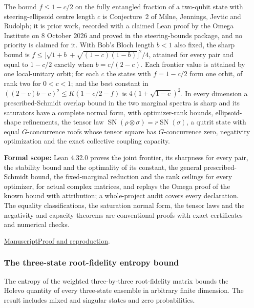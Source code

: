 \documentclass[11pt,a4paper]{article}
\begin{document}
The bound $f\leq1-c/2$ on the fully entangled fraction of a two-qubit state with steering-ellipsoid centre length $c$ is Conjecture~2 of Milne, Jennings, Jevtic and Rudolph; it is prior work, recorded with a claimed Lean proof by the Omega Institute on 8 October 2026 and proved in the steering-bounds package, and no priority is claimed for it. With Bob's Bloch length $b<1$ also fixed, the sharp bound is $f\leq\bigl[\sqrt{1+b}+\sqrt{(1-c)(1-b)}\bigr]^2/4$, attained for every pair and equal to $1-c/2$ exactly when $b=c/(2-c)$. Each frontier value is attained by one local-unitary orbit; for each $c$ the states with $f=1-c/2$ form one orbit, of rank two for $0<c<1$; and the best constant in $((2-c)b-c)^2\leq K(1-c/2-f)$ is $4(1+\sqrt{1-c})^2$. In every dimension a prescribed-Schmidt overlap bound in the two marginal spectra is sharp and its saturators have a complete normal form, with optimizer-rank bounds, ellipsoid-shape refinements, the tensor law $\operatorname{SN}(\rho\otimes\sigma)=r\operatorname{SN}(\sigma)$, a qutrit state with equal $G$-concurrence roofs whose tensor square has $G$-concurrence zero, negativity optimization and the exact collective coupling capacity.

\noindent\textbf{Formal scope:} Lean 4.32.0 proves the joint frontier, its sharpness for every pair, the stability bound and the optimality of its constant, the general prescribed-Schmidt bound, the fixed-marginal reduction and the rank ceilings for every optimizer, for actual complex matrices, and replays the Omega proof of the known bound with attribution; a whole-project audit covers every declaration. The equality classifications, the saturation normal form, the tensor laws and the negativity and capacity theorems are conventional proofs with exact certificates and numerical checks.

\href{https://github.com/dvgyl/math-and-theory/blob/main/papers/physics/entangled-fraction-frontier/manuscript.pdf}{Manuscript}\quad\href{https://github.com/dvgyl/math-and-theory/blob/main/papers/physics/entangled-fraction-frontier/README.md}{Proof and reproduction}.

\subsubsection{The three-state root-fidelity entropy bound}

The entropy of the weighted three-by-three root-fidelity matrix bounds the Holevo quantity of every three-state ensemble in arbitrary finite dimension. The result includes mixed and singular states and zero probabilities.
\end{document}
